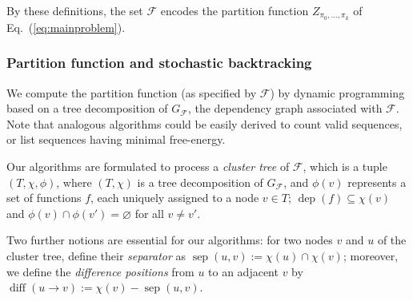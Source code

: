 \documentclass[]{bmcart}
\newcommand{\dep}{\operatorname{dep}}
\newcommand{\partfun}[1]{Z_{#1}}
\newcommand{\separator}[2]{\operatorname{sep}(#1,#2)}
\newcommand{\difference}[2]{\operatorname{diff}(#1 \rightarrow #2)}
\newcommand{\F}{\mathcal{F}}
\newcommand{\Def}[1]{\emph{#1}}
\begin{document}
By these definitions, the set $\F$ encodes the partition function $\partfun{\pi_0,\dots,\pi_k}$ of Eq.~(\ref{eq:mainproblem}).

\subsubsection*{Partition function and stochastic backtracking}\label{sec:PF}

We compute the partition function (as specified by $\F$) by dynamic programming based
on a tree decomposition of $G_{\F}$, the dependency graph associated with $\F$.
Note that analogous algorithms could be easily derived to count valid sequences, or list sequences having minimal free-energy.

%

Our algorithms are formulated to process a \Def{cluster tree} of $\F$, which is a tuple $(T,\chi,\phi)$, where
$(T,\chi)$ is a tree decomposition of $G_\F$, and $\phi(v)$ represents
a set of functions $f$, each uniquely assigned to a node $v\in T$;
$\dep(f)\subseteq\chi(v)$ and $\phi(v)\cap \phi(v')=\varnothing$ for
all $v\neq v'$. 

Two further notions are essential for our algorithms: for two nodes $v$ and $u$ of the cluster tree, define
their \Def{separator} as $\separator{u}{v} := \chi(u)\cap\chi(v)$;
moreover, we define the \Def{difference positions} from $u$ to an
adjacent $v$ by $\difference{u}{v}:=\chi(v) - \separator{u}{v}$.
\end{document}
